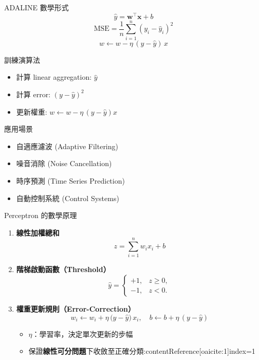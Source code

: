 \documentclass{beamer}
\begin{document}
\begin{frame}{ADALINE 數學形式}
\[
  \hat y = \mathbf{w}^\top \mathbf{x} + b
\]
\[
  \mathrm{MSE} = \frac{1}{n}\sum_{i=1}^n(y_i - \hat y_i)^2
\]
\[
  w \leftarrow w - \eta\,(y - \hat y)\,x
\]
\end{frame}

\begin{frame}{訓練演算法}
\begin{itemize}
\item 計算 linear aggregation: $\hat y$
\item 計算 error: $(y - \hat y)^2$
\item 更新權重: $w \leftarrow w - \eta\,(y - \hat y)x$
\end{itemize}
\end{frame}

\begin{frame}{應用場景}
\begin{itemize}
\item 自適應濾波 (Adaptive Filtering)
\item 噪音消除 (Noise Cancellation)
\item 時序預測 (Time Series Prediction)
\item 自動控制系統 (Control Systems)
\end{itemize}
\end{frame}

\begin{frame}{Perceptron 的數學原理}
\begin{enumerate}
  \item \textbf{線性加權總和}
  \[
    z = \sum_{i=1}^{n} w_i x_i + b
  \]
  \item \textbf{階梯啟動函數（Threshold）}
  \[
    \hat{y} =
    \begin{cases}
      +1, & z \ge 0,\\
      -1, & z < 0.
    \end{cases}
  \]
  \item \textbf{權重更新規則（Error-Correction）}
  \[
    w_i \leftarrow w_i + \eta\,\bigl(y - \hat{y}\bigr)\,x_i,
    \quad
    b \leftarrow b + \eta\,(y - \hat{y})
  \]
  \begin{itemize}
    \item $\eta$：學習率，決定單次更新的步幅  
    \item 保證\textbf{線性可分問題}下收斂至正確分類:contentReference[oaicite:1]{index=1}
  \end{itemize}
\end{enumerate}
\end{frame}
\end{document}
